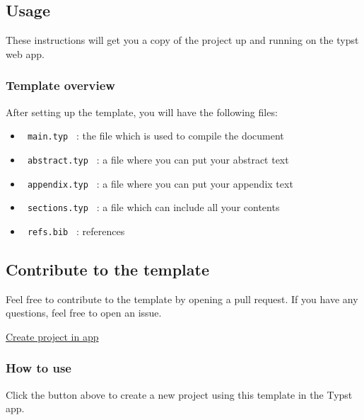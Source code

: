 \subsection{Usage}\label{usage}

These instructions will get you a copy of the project up and running on
the typst web app.

\begin{Shaded}
\begin{Highlighting}[]
\end{Highlighting}
\end{Shaded}

\subsubsection{Template overview}\label{template-overview}

After setting up the template, you will have the following files:

\begin{itemize}
\tightlist
\item
  \texttt{\ main.typ\ } : the file which is used to compile the document
\item
  \texttt{\ abstract.typ\ } : a file where you can put your abstract
  text
\item
  \texttt{\ appendix.typ\ } : a file where you can put your appendix
  text
\item
  \texttt{\ sections.typ\ } : a file which can include all your contents
\item
  \texttt{\ refs.bib\ } : references
\end{itemize}

\subsection{Contribute to the
template}\label{contribute-to-the-template}

Feel free to contribute to the template by opening a pull request. If
you have any questions, feel free to open an issue.

\href{/app?template=vienna-tech&version=0.1.2}{Create project in app}

\subsubsection{How to use}\label{how-to-use}

Click the button above to create a new project using this template in
the Typst app.

